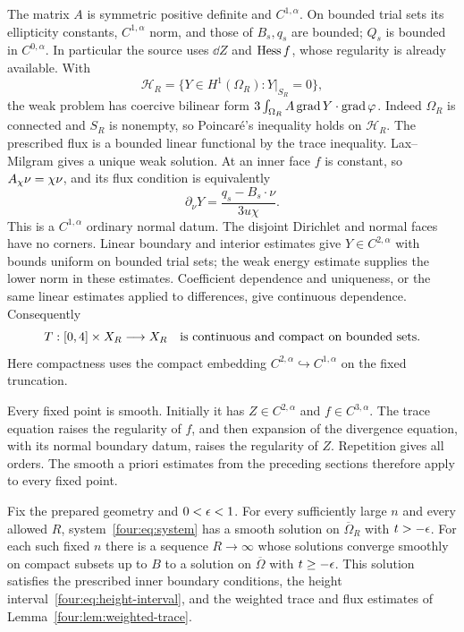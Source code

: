 The matrix $A$ is symmetric positive definite and $C^{1,\alpha}$.
On bounded trial sets its ellipticity constants, $C^{1,\alpha}$ norm,
and those of $B_s,q_s$ are bounded; $Q_s$ is bounded in $C^{0,\alpha}$.
In particular the source uses $\dd Z$ and $\operatorname{Hess} f$, whose regularity
is already available.  With
\[
 \mathcal H_R=\{Y\in H^1(\Omega_R):Y|_{S_R}=0\},
\]
the weak problem has coercive bilinear form
$3\int_{\Omega_R} A\operatorname{grad} Y\cdot\operatorname{grad}\varphi$.
Indeed $\Omega_R$ is connected and $S_R$ is nonempty, so Poincar\'e's
inequality holds on $\mathcal H_R$.  The prescribed flux is a bounded
linear functional by the trace inequality.  Lax--Milgram gives a unique
weak solution.  At an inner face $f$ is constant, so
$A_\chi\nu=\chi\nu$, and its flux condition is equivalently
\[
 \partial_\nu Y=\frac{q_s-B_s\cdot\nu}{3u\chi}.
\]
This is a $C^{1,\alpha}$ ordinary normal datum.  The disjoint Dirichlet
and normal faces have no corners.  Linear boundary and interior
estimates give $Y\in C^{2,\alpha}$ with bounds uniform on bounded
trial sets; the weak energy estimate supplies the lower norm in these
estimates.  Coefficient dependence and uniqueness, or the same linear
estimates applied to differences, give continuous dependence.
Consequently
\begin{equation}\label{four:ex:compact-map}
 T:[0,4]\times X_R\longrightarrow X_R
 \quad\hbox{is continuous and compact on bounded sets}.
\end{equation}
Here compactness uses the compact embedding
$C^{2,\alpha}\hookrightarrow C^{1,\alpha}$ on the fixed truncation.

Every fixed point is smooth.  Initially it has $Z\in C^{2,\alpha}$
and $f\in C^{3,\alpha}$.  The trace equation raises the regularity of
$f$, and then expansion of the divergence equation, with its normal
boundary datum, raises the regularity of $Z$.  Repetition gives all
orders.  The smooth a priori estimates from the preceding sections
therefore apply to every fixed point.

\begin{proposition}\label{four:prop:existence}
Fix the prepared geometry and $0<\epsilon<1$.  For every sufficiently large
$n$ and every allowed $R$, system~\eqref{four:eq:system} has a smooth
solution on $\overline\Omega_R$ with $t>-\epsilon$.  For each such fixed
$n$ there is a sequence $R\to\infty$ whose solutions converge smoothly
on compact subsets up to $B$ to a solution on $\overline\Omega$ with
$t\ge-\epsilon$.  This solution satisfies the prescribed inner boundary
conditions, the height interval~\eqref{four:eq:height-interval}, and the
weighted trace and flux estimates of Lemma~\ref{four:lem:weighted-trace}.
\end{proposition}

